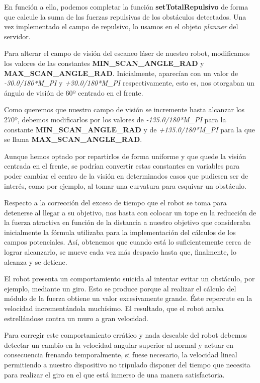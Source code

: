 \documentclass[a4paper, 11pt]{article}
\begin{document}
	En función a ella, podemos completar la función \textbf{setTotalRepulsivo} de forma que calcule la
	suma de las fuerzas repulsivas de los obstáculos detectados. Una vez implementado el campo de repulsivo,
	lo usamos en el objeto \textit{planner} del servidor.
	
	Para alterar el campo de visión del escaneo láser de nuestro robot, modificamos los valores de las
	constantes \textbf{MIN\_SCAN\_ANGLE\_RAD} y \textbf{MAX\_SCAN\_ANGLE\_RAD}. Inicialmente, aparecían
	con un valor de \textit{-30.0/180*M\_PI} y \textit{+30.0/180*M\_PI} respectivamente, esto es, nos
	otorgaban un ángulo de visión de 60º centrado en el frente.
	
	Como queremos que nuestro campo de visión se incremente hasta alcanzar los 270º, debemos modificarlos
	por los valores de \textit{-135.0/180*M\_PI} para la constante \textbf{MIN\_SCAN\_ANGLE\_RAD} y de
	\textit{+135.0/180*M\_PI} para la que se llama \textbf{MAX\_SCAN\_ANGLE\_RAD}.
	
	Aunque hemos optado por repartirlos de forma uniforme y que quede la visión centrada en el frente,
	se podrían convertir estas constantes en variables para poder cambiar el centro de la visión en
	determinados casos que pudiesen ser de interés, como por ejemplo, al tomar una curvatura para esquivar
	un obstáculo.

	Respecto a la corrección del exceso de tiempo que el robot se toma para detenerse al llegar a su
	objetivo, nos basta con colocar un tope en la reducción de la fuerza atractiva en función de la
	distancia a nuestro objetivo que consideraba inicialmente la fórmula utilizaba para la implementación
	del cálculos de los campos potenciales. Así, obtenemos que cuando está lo suficientemente cerca de
	lograr alcanzarlo, se mueve cada vez más despacio hasta que, finalmente, lo alcanza y se detiene.
	
	El robot presenta un comportamiento suicida al intentar evitar un obstáculo, por ejemplo, mediante
	un giro. Esto se produce porque al realizar el cálculo del módulo de la fuerza obtiene un valor
	excesivamente grande. Éste repercute en la velocidad incrementándola muchísimo. El resultado, que
	el robot acaba estrellándose contra un muro a gran velocidad.
	
	Para corregir este comportamiento errático y nada deseable del robot debemos detectar un cambio en
	la velocidad angular superior al normal y actuar en consecuencia frenando temporalmente, si fuese
	necesario, la velocidad lineal permitiendo a nuestro dispositivo no tripulado disponer del tiempo
	que necesita para realizar el giro en el que está inmerso de una manera satisfactoria.
	
\end{document}
